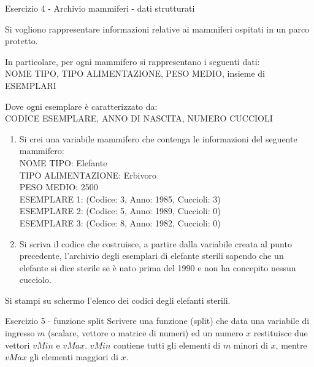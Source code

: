 \documentclass[handout]{beamer}
\begin{document}
\begin{frame}[allowframebreaks]{Esercizio 4 - Archivio mammiferi - dati strutturati}

	Si vogliono rappresentare informazioni relative ai mammiferi ospitati in un
	parco protetto.
	
	In particolare, per ogni mammifero si rappresentano i seguenti dati:\\
	NOME TIPO, TIPO ALIMENTAZIONE, PESO MEDIO, insieme di ESEMPLARI
	
	Dove ogni esemplare è caratterizzato da:\\
	CODICE ESEMPLARE, ANNO DI NASCITA, NUMERO CUCCIOLI
	
	\begin{enumerate}
	\item Si crei una variabile mammifero che contenga le informazioni del
	seguente mammifero:\\
	NOME TIPO: Elefante\\
	TIPO ALIMENTAZIONE: Erbivoro\\
	PESO MEDIO: 2500\\
	ESEMPLARE 1: (Codice: 3, Anno: 1985, Cuccioli: 3)\\
	ESEMPLARE 2: (Codice: 5, Anno: 1989, Cuccioli: 0)\\
	ESEMPLARE 3: (Codice: 8, Anno: 1982, Cuccioli: 0)\\
	
	\item Si scriva il codice che costruisce, a partire dalla variabile creata al punto
	precedente, l'archivio degli esemplari di elefante sterili sapendo che un
	elefante si dice sterile se è nato prima del 1990 e non ha concepito
	nessun cucciolo.
\end{enumerate}

	Si stampi su schermo l'elenco dei codici degli elefanti sterili.
	
\end{frame}

\begin{frame}{Esercizio 5 - funzione split}
Scrivere una funzione (split) che data una variabile di ingresso $m$ (scalare, vettore o
matrice di numeri) ed un numero $x$ restituisce due vettori $vMin$ e $vMax$. $vMin$
contiene tutti gli elementi di $m$ minori di $x$, mentre $vMax$ gli elementi maggiori
di $x$.
\end{frame}
\end{document}
